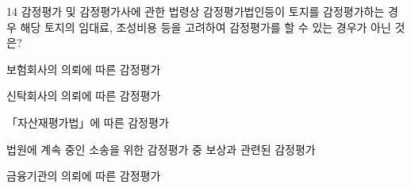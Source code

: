 \begin{question}{14}
감정평가 및 감정평가사에 관한 법령상 감정평가법인등이 토지를 감정평가하는 경우 해당 토지의 임대료, 조성비용 등을 고려하여 감정평가를 할 수 있는 경우가 아닌 것은?
\begin{choices}
  \item 보험회사의 의뢰에 따른 감정평가
  \item 신탁회사의 의뢰에 따른 감정평가
  \item 「자산재평가법」에 따른 감정평가
  \item 법원에 계속 중인 소송을 위한 감정평가 중 보상과 관련된 감정평가
  \item 금융기관의 의뢰에 따른 감정평가
\end{choices}
\end{question}
